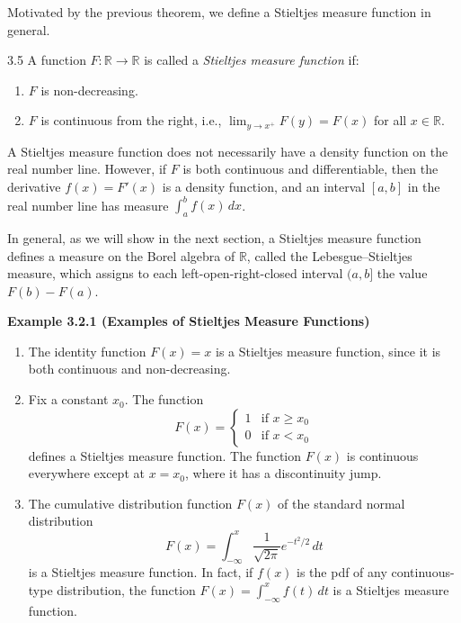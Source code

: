 Motivated by the previous theorem, we define a Stieltjes measure function in general.

\begin{defbox}{3.5}
A function $F: \mathbb{R} \to \mathbb{R}$ is called a \textit{Stieltjes measure function} if:
\begin{enumerate}
    \item $F$ is non-decreasing.
    \item $F$ is continuous from the right, i.e., $\lim_{y \to x^+} F(y) = F(x)$ for all $x \in \mathbb{R}$.
\end{enumerate}
\end{defbox}
A Stieltjes measure function does not necessarily have a density function on the real number line. However, if $F$ is both continuous and differentiable, then the derivative $f(x) = F'(x)$ is a density function, and an interval $[a, b]$ in the real number line has measure $\int_{a}^{b} f(x) \, dx$.

In general, as we will show in the next section, a Stieltjes measure function defines a measure on the Borel algebra of $\mathbb{R}$, called the Lebesgue--Stieltjes measure, which assigns to each left-open-right-closed interval $(a, b]$ the value $F(b) - F(a)$.

\textbf{Example 3.2.1 (Examples of Stieltjes Measure Functions)}
\begin{enumerate}
    \item The identity function $F(x) = x$ is a Stieltjes measure function, since it is both continuous and non-decreasing.
    \item Fix a constant $x_0$. The function
    \[
    F(x) = \begin{cases} 1 & \text{if } x \ge x_0 \\ 0 & \text{if } x < x_0 \end{cases}
    \]
    defines a Stieltjes measure function. The function $F(x)$ is continuous everywhere except at $x = x_0$, where it has a discontinuity jump.
    \item The cumulative distribution function $F(x)$ of the standard normal distribution
    \[
    F(x) = \int_{-\infty}^{x} \frac{1}{\sqrt{2\pi}} e^{-t^2/2} \, dt
    \]
    is a Stieltjes measure function. In fact, if $f(x)$ is the pdf of any continuous-type distribution, the function $F(x) = \int_{-\infty}^{x} f(t) \, dt$ is a Stieltjes measure function.
\end{enumerate}